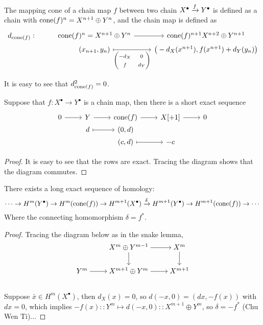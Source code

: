 \begin{definition}
  The {mapping cone} of a chain map $f$ between two chain $X^\bullet \xrightarrow{f} Y^\bullet$
  is defined as a chain with $\operatorname{cone}(f)^n = X^{n+1} \oplus Y^n$,
  and the chain map is defined as
  \[ \begin{tikzcd}[row sep=0, ampersand replacement=\&]
      d_{\cone(f)} : \& \cone(f)^n = X^{n+1} \oplus Y^n \ar[r] \& \cone(f)^{n+1} X^{n+2} \oplus Y^{n+1} \\
      \& (x_{n+1}, y_n) \ar[r, mapsto, "{\begin{pmatrix} -d_X & 0 \\ f & d_Y \end{pmatrix}}"']
      \& \big(-d_X(x^{n+1}), f(x^{n+1}) + d_Y(y_n)\big) \\
    \end{tikzcd} \]
\end{definition}

It is easy to see that $d_{\operatorname{cone}(f)}^2 = 0$.

\begin{prop}
  Suppose that $f : X^\bullet \to Y^\bullet$ is a chain map,
  then there is a short exact sequence
  \[ \begin{tikzcd}[row sep=0pt]
      0 \ar[r] & Y \ar[r] & \cone(f) \ar[r] & X[+1] \ar[r] & 0 \\
      & d \ar[mapsto, r] & (0, d) & & \\
      & & (c, d) \ar[mapsto, r] & -c & \\
    \end{tikzcd} \]

  \begin{proof}
    It is easy to see that the rows are exact.
    Tracing the diagram shows that the diagram commutes.
  \end{proof}
\end{prop}

\begin{coro}
  There exists a long exact sequence of homology:
  \[ \cdots \to H^{m}(Y^\bullet) \to H^{m}(\operatorname{cone}(f)) \to H^{m+1}(X^\bullet)
    \xrightarrow{\delta} H^{m+1}(Y^\bullet) \to H^{m+1}(\operatorname{cone}(f)) \to \cdots \]
  Where the connecting homomorphism $\delta = f^*$.

  \begin{proof}
    Tracing the diagram below as in the snake lemma,
    \[ \begin{tikzcd}[cramped]
        & X^{m} \oplus Y^{m-1} \ar[r] \ar[d] & X^{m} \ar[d] \\
        Y^{m} \ar[r] & X^{m+1} \oplus Y^{m} \ar[r]  & X^{m+1} \\
    \end{tikzcd} \]
  Suppose $\bar{x} \in H^m(X^\bullet)$, then $d_X(x) = 0$,
  so $d (-x, 0) = (dx, -f(x))$ with $dx = 0$, which implies
  $-f(x) :: Y^m \mapsto d (-x, 0) :: X^{m+1} \oplus Y^m$,
  so $\delta = -f^*$ (Chu Wen Ti)...
  \end{proof}
\end{coro}

